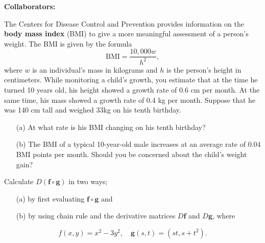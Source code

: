 \documentclass[11pt,letterpaper,boxed]{hmcpset}
\begin{document}
\noindent\textbf{Collaborators:} 


\begin{problem}[Colley 2.5 \#8]
The Centers for Disease Control and Prevention provides information on the
\textbf{body mass index} (BMI) to give a more meaningful assessment of a person's
weight. The BMI is given by the formula
\[
	\text{BMI} = \frac{10,000w}{h^2},
\]	
where $w$ is an individual's mass in kilograms and $h$ is the person's height in centimeters. While monitoring a child's growth, you estimate that
at the time he turned 10 years old, his height showed a growth rate of $0.6$ cm per month. At the same time, his mass showed a growth rate of 0.4 kg
per month. Suppose that he was 140 cm tall and weighed 33kg on his tenth birthday.
\begin{enumerate}
\item[(a)] At what rate is his BMI changing on his tenth birthday?
\item[(b)] The BMI of a typical 10-year-old male increases at an average rate of 0.04 BMI points per month. Should
you be concerned about the child's weight gain?
\end{enumerate}
\end{problem}

\begin{solution}
\vfill
\end{solution}
\newpage

\begin{problem}[Colley 2.5 \#22]
Calculate $D(\mathbf{f}\circ\mathbf{g})$ in two ways;
\begin{enumerate}
\item[(a)] by first evaluating $\mathbf{f}\circ\mathbf{g}$ and
\item[(b)] by using chain rule and the derivative matrices $D\mathbf{f}$ and $D\mathbf{g}$, where
\end{enumerate}
\[
	f(x,y) = x^2-3y^2, \quad \mathbf{g}(s,t) = (st,s+t^2).
\]	
\end{problem}

\begin{solution}
\vfill
\end{solution}
\newpage
\end{document}
